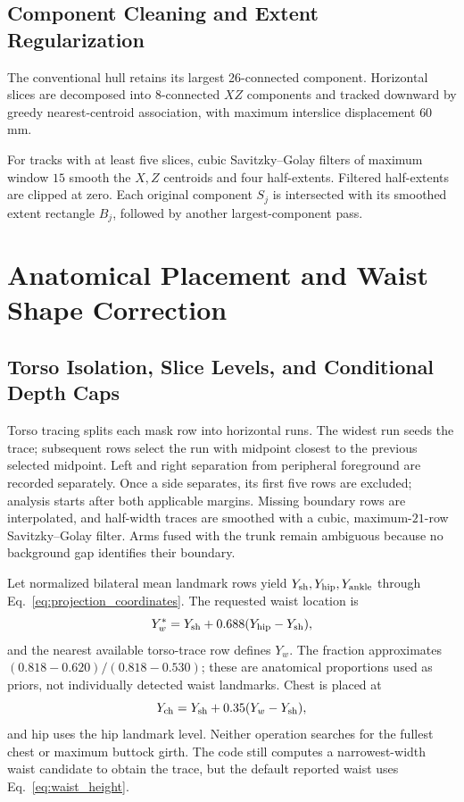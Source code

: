 \documentclass[11pt,a4paper]{article}
\numberwithin{equation}{section}
\begin{document}
\subsection{Component Cleaning and Extent Regularization}
\label{subsec:extent_reg}
The conventional hull retains its largest 26-connected component. Horizontal slices are decomposed into 8-connected $XZ$ components and tracked downward by greedy nearest-centroid association, with maximum interslice displacement $60$\,mm.

For tracks with at least five slices, cubic Savitzky--Golay filters of maximum window $15$ smooth the $X,Z$ centroids and four half-extents. Filtered half-extents are clipped at zero. Each original component $S_j$ is intersected with its smoothed extent rectangle $B_j$, followed by another largest-component pass.

\section{Anatomical Placement and Waist Shape Correction}
\subsection{Torso Isolation, Slice Levels, and Conditional Depth Caps}
\label{subsec:anatomical_levels}
Torso tracing splits each mask row into horizontal runs. The widest run seeds the trace; subsequent rows select the run with midpoint closest to the previous selected midpoint. Left and right separation from peripheral foreground are recorded separately. Once a side separates, its first five rows are excluded; analysis starts after both applicable margins. Missing boundary rows are interpolated, and half-width traces are smoothed with a cubic, maximum-$21$-row Savitzky--Golay filter. Arms fused with the trunk remain ambiguous because no background gap identifies their boundary.

Let normalized bilateral mean landmark rows yield $Y_{\rm sh},Y_{\rm hip},Y_{\rm ankle}$ through Eq.~\eqref{eq:projection_coordinates}. The requested waist location is
\begin{equation}
Y_w^*=Y_{\rm sh}+0.688(Y_{\rm hip}-Y_{\rm sh}),
\label{eq:waist_height}
\end{equation}
and the nearest available torso-trace row defines $Y_w$. The fraction approximates $(0.818-0.620)/(0.818-0.530)$; these are anatomical proportions used as priors, not individually detected waist landmarks. Chest is placed at
\begin{equation}
Y_{\rm ch}=Y_{\rm sh}+0.35(Y_w-Y_{\rm sh}),
\label{eq:chest_height}
\end{equation}
and hip uses the hip landmark level. Neither operation searches for the fullest chest or maximum buttock girth. The code still computes a narrowest-width waist candidate to obtain the trace, but the default reported waist uses Eq.~\eqref{eq:waist_height}.
\end{document}
